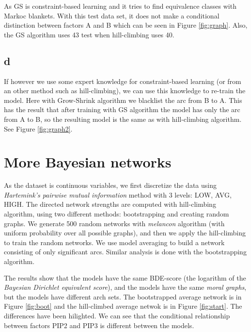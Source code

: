 \documentclass[a4paper,english]{article}
\begin{document}
As GS is constraint-based learning and it tries to find equivalence classes with Markoc blankets. With this test data set, it does not make a conditional distinction between factors A and B which can be seen in Figure \ref{fig:graph}. Also, the GS algorithm uses 43 test when hill-climbing uses 40.

\subsection*{d}
If however we use some expert knowledge for constraint-based learning (or from an other method such as hill-climbing), we can use this knowledge to re-train the model. Here with Grow-Shrink algorithm we blacklist the arc from B to A. This has the result that after training with GS algorithm the model has only the arc from A to B, so the resulting model is the same as with hill-climbing algorithm. See Figure \ref{fig:graph2}.

\section{More Bayesian networks}
As the dataset is continuous variables, we first discretize the data using \emph{Hartemink’s pairwise mutual information} method with 3 levels: LOW, AVG, HIGH. The directed network strengths are computed with hill-climbing algorithm, using two different methods: bootstrapping and creating random graphs. We generate 500 random networks with \emph{melancon} algorithm (with uniform probability over all possible graphs), and then we apply the hill-climbing to train the random networks. We use model averaging to build a network consisting of only significant arcs. Similar analysis is done with the bootstrapping algorithm.

The results show that the models have the same BDE-score (the logarithm of the \emph{Bayesian Dirichlet equivalent score}), and the models have the same \emph{moral graphs}, but the models have different arch sets. The bootstrapped average network is in Figure \ref{fig:boot} and the hill-climbed average netwok is in Figure \ref{fig:start}. The differences have been hilighted. We can see that the conditional relationship between factors PIP2 and PIP3 is different between the models.
\end{document}
